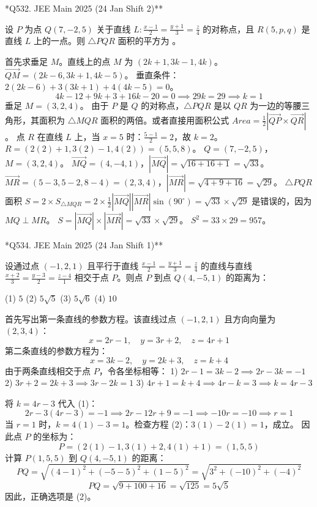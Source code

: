 \begin{questions}
\question **Q532. JEE Main 2025 (24 Jan Shift 2)**

设 $P$ 为点 $Q(7, -2, 5)$ 关于直线 $L : \frac{x-1}{2} = \frac{y+1}{3} = \frac{z}{4}$ 的对称点，且 $R(5, p, q)$ 是直线 $L$ 上的一点。则 $\triangle PQR$ 面积的平方为 \underline{\hspace{1cm}}。

\begin{solution}
首先求垂足 $M$。直线上的点 $M$ 为 $(2k+1, 3k-1, 4k)$。
$\vec{QM} = (2k-6, 3k+1, 4k-5)$。
垂直条件：$2(2k-6) + 3(3k+1) + 4(4k-5) = 0$。
\[
4k - 12 + 9k + 3 + 16k - 20 = 0 \implies 29k = 29 \implies k = 1
\]
垂足 $M = (3, 2, 4)$。
由于 $P$ 是 $Q$ 的对称点，$\triangle PQR$ 是以 $QR$ 为一边的等腰三角形，其面积为 $\triangle MQR$ 面积的两倍。或者直接用面积公式 $Area = \frac{1}{2} | \vec{QP} \times \vec{QR} |$。
点 $R$ 在直线 $L$ 上，当 $x=5$ 时：$\frac{5-1}{2} = 2$，故 $k=2$。
$R = (2(2)+1, 3(2)-1, 4(2)) = (5, 5, 8)$。
$Q = (7, -2, 5)$，$M = (3, 2, 4)$。
$\vec{MQ} = (4, -4, 1)$，$|\vec{MQ}| = \sqrt{16+16+1} = \sqrt{33}$。
$\vec{MR} = (5-3, 5-2, 8-4) = (2, 3, 4)$，$|\vec{MR}| = \sqrt{4+9+16} = \sqrt{29}$。
$\triangle PQR$ 面积 $S = 2 \times S_{\triangle MQR} = 2 \times \frac{1}{2} |\vec{MQ}| |\vec{MR}| \sin(90^\circ) = \sqrt{33} \times \sqrt{29}$ 是错误的，因为 $MQ \perp MR$。
$S = |\vec{MQ}| \times |\vec{MR}| = \sqrt{33} \times \sqrt{29}$。
$S^2 = 33 \times 29 = 957$。
\end{solution}

\question **Q534. JEE Main 2025 (24 Jan Shift 1)**

设通过点 $(-1, 2, 1)$ 且平行于直线 $\frac{x-1}{2} = \frac{y+1}{3} = \frac{z}{4}$ 的直线与直线 $\frac{x+2}{3} = \frac{y-3}{2} = \frac{z-4}{1}$ 相交于点 $P$。则点 $P$ 到点 $Q(4, -5, 1)$ 的距离为：

(1) $5$ \quad (2) $5\sqrt{5}$ \quad (3) $5\sqrt{6}$ \quad (4) $10$

\begin{solution}
首先写出第一条直线的参数方程。该直线过点 $(-1, 2, 1)$ 且方向向量为 $(2, 3, 4)$：
\[
x = 2r - 1, \quad y = 3r + 2, \quad z = 4r + 1
\]
第二条直线的参数方程为：
\[
x = 3k - 2, \quad y = 2k + 3, \quad z = k + 4
\]
由于两条直线相交于点 $P$，令各坐标相等：
1) $2r - 1 = 3k - 2 \implies 2r - 3k = -1$
2) $3r + 2 = 2k + 3 \implies 3r - 2k = 1$
3) $4r + 1 = k + 4 \implies 4r - k = 3 \implies k = 4r - 3$

将 $k = 4r - 3$ 代入 (1)：
\[
2r - 3(4r - 3) = -1 \implies 2r - 12r + 9 = -1 \implies -10r = -10 \implies r = 1
\]
当 $r = 1$ 时，$k = 4(1) - 3 = 1$。检查方程 (2)：$3(1) - 2(1) = 1$，成立。
因此点 $P$ 的坐标为：
\[
P = (2(1)-1, 3(1)+2, 4(1)+1) = (1, 5, 5)
\]
计算 $P(1, 5, 5)$ 到 $Q(4, -5, 1)$ 的距离：
\[
PQ = \sqrt{(4-1)^2 + (-5-5)^2 + (1-5)^2} = \sqrt{3^2 + (-10)^2 + (-4)^2}
\]
\[
PQ = \sqrt{9 + 100 + 16} = \sqrt{125} = 5\sqrt{5}
\]
因此，正确选项是 (2)。
\end{solution}


\end{questions}
